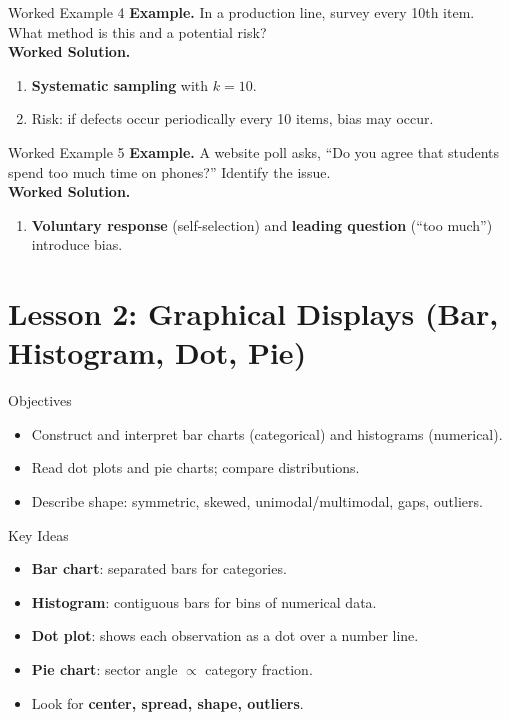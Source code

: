 \documentclass[aspectratio=169]{beamer}
\newcommand{\exampletitle}[1]{\vspace{0.25em}\textbf{Example.} #1\vspace{0.25em}}
\newcommand{\worked}{\textbf{Worked Solution.}}
\begin{document}
\begin{frame}{Worked Example 4}
\exampletitle{In a production line, survey every 10th item. What method is this and a potential risk?}\\[0.25em]
\worked
\begin{enumerate}
  \item \textbf{Systematic sampling} with $k=10$.
  \item Risk: if defects occur periodically every 10 items, bias may occur.
\end{enumerate}
\end{frame}

\begin{frame}{Worked Example 5}
\exampletitle{A website poll asks, “Do you agree that students spend too much time on phones?” Identify the issue.}\\[0.25em]
\worked
\begin{enumerate}
  \item \textbf{Voluntary response} (self-selection) and \textbf{leading question} (“too much”) introduce bias.
\end{enumerate}
\end{frame}

\section{Lesson 2: Graphical Displays (Bar, Histogram, Dot, Pie)}

\begin{frame}{Objectives}
\begin{itemize}
  \item Construct and interpret bar charts (categorical) and histograms (numerical).
  \item Read dot plots and pie charts; compare distributions.
  \item Describe shape: symmetric, skewed, unimodal/multimodal, gaps, outliers.
\end{itemize}
\end{frame}

\begin{frame}{Key Ideas}
\begin{itemize}
  \item \textbf{Bar chart}: separated bars for categories.
  \item \textbf{Histogram}: contiguous bars for bins of numerical data.
  \item \textbf{Dot plot}: shows each observation as a dot over a number line.
  \item \textbf{Pie chart}: sector angle $\propto$ category fraction.
  \item Look for \textbf{center, spread, shape, outliers}.
\end{itemize}
\end{frame}
\end{document}
